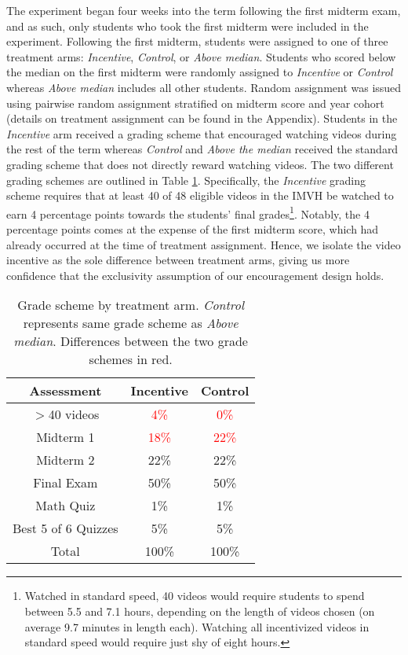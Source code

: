 \documentclass[12pt]{article}
\newcommand{\red}[1]{\textcolor{red}{#1}}
\begin{document}
The experiment began four weeks into the term following the first midterm exam, and as such, only students who took the first midterm were included in the experiment. Following the first midterm, students were assigned to one of three treatment arms: \textit{Incentive}, \textit{Control}, or \textit{Above median}. Students who scored below the median on the first midterm were randomly assigned to \textit{Incentive} or \textit{Control} whereas \textit{Above median} includes all other students. Random assignment was issued using pairwise random assignment stratified on midterm score and year cohort (details on treatment assignment can be found in the Appendix). Students in the \textit{Incentive} arm received a grading scheme that encouraged watching videos during the rest of the term whereas \textit{Control} and \textit{Above the median} received the standard grading scheme that does not directly reward watching videos. The two different grading schemes are outlined in Table \ref{gradescheme}. Specifically, the \textit{Incentive} grading scheme requires that at least 40 of 48 eligible videos in the IMVH be watched to earn 4 percentage points towards the students' final grades\footnote{Watched in standard speed, 40 videos would require students to spend between 5.5 and 7.1 hours, depending on the length of videos chosen (on average 9.7 minutes in length each). Watching all incentivized videos in standard speed would require just shy of eight hours.}.
Notably, the 4 percentage points comes at the expense of the first midterm score, which had already occurred at the time of treatment assignment. Hence, we isolate the video incentive as the sole difference between treatment arms, giving us more confidence that the exclusivity assumption of our encouragement design holds. %

\begin{table}
	\caption{Grade scheme by treatment arm. \textit{Control} represents same grade scheme as \textit{Above median}. Differences between the two grade schemes in red.}
	\centering
	\begin{tabular}{ c|c|c } 
		Assessment & Incentive & Control \\
		\hline
		$>$40 videos & \red{4\%} & \red{0\%} \\ 
		Midterm 1 & \red{18\%} & \red{22\%} \\ 
		Midterm 2 & 22\% & 22\% \\ 
		Final Exam & 50\% & 50\% \\ 
		Math Quiz & 1\% & 1\% \\ 
		Best 5 of 6 Quizzes & 5\% & 5\% \\ 
		\hline
		Total & 100\% & 100\% \\
	\end{tabular} 
	\label{gradescheme}
\end{table}
\end{document}
